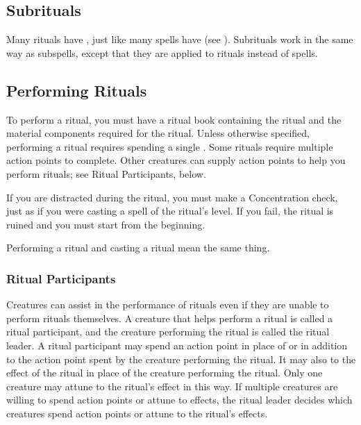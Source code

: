     \subsection{Subrituals}
        Many rituals have , just like many spells have  (see ).
        Subrituals work in the same way as subspells, except that they are applied to rituals instead of spells.

    \subsection{Performing Rituals}
        To perform a ritual, you must have a ritual book containing the ritual and the material components required for the ritual.
        Unless otherwise specified, performing a ritual requires spending a single .
        Some rituals require multiple action points to complete.
        Other creatures can supply action points to help you perform rituals; see Ritual Participants, below.

        If you are distracted during the ritual, you must make a Concentration check, just as if you were casting a spell of the ritual's level.
        If you fail, the ritual is ruined and you must start from the beginning.
        \par Performing a ritual and casting a ritual mean the same thing.

        \subsubsection{Ritual Participants}
            Creatures can assist in the performance of rituals even if they are unable to perform rituals themselves.
            A creature that helps perform a ritual is called a ritual participant, and the creature performing the ritual is called the ritual leader.
            A ritual participant may spend an action point in place of or in addition to the action point spent by the creature performing the ritual.
            It may also  to the effect of the ritual in place of the creature performing the ritual.
            Only one creature may attune to the ritual's effect in this way.
            If multiple creatures are willing to spend action points or attune to effects, the ritual leader decides which creatures spend action points or attune to the ritual's effects.

